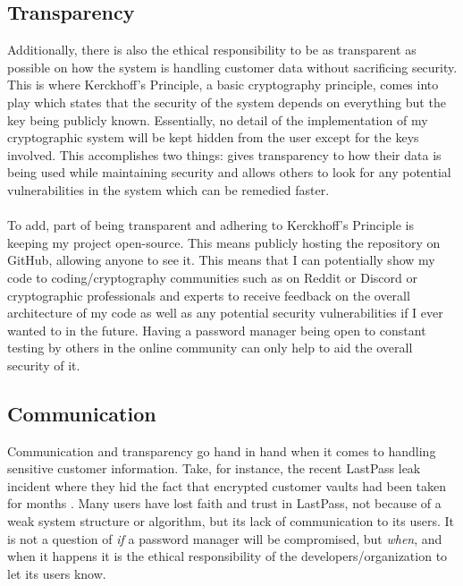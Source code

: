 \documentclass[10pt,twocolumn]{article}
\begin{document}
\subsection{Transparency}
Additionally, there is also the ethical responsibility to be as transparent as possible on how the system is handling customer data without sacrificing security. This is where Kerckhoff's Principle, a basic cryptography principle, comes into play which states that the security of the system depends on everything but the key being publicly known. Essentially, no detail of the implementation of my cryptographic system will be kept hidden from the user except for the keys involved. This accomplishes two things: gives transparency to how their data is being used while maintaining security and allows others to look for any potential vulnerabilities in the system which can be remedied faster\cite{mrdovic2008kerckhoffs}.
\paragraph{}
To add, part of being transparent and adhering to Kerckhoff's Principle is keeping my project open-source. This means publicly hosting the repository on GitHub, allowing anyone to see it. This means that I can potentially show my code to coding/cryptography communities such as on Reddit or Discord or cryptographic professionals and experts to receive feedback on the overall architecture of my code as well as any potential security vulnerabilities if I ever wanted to in the future. Having a password manager being open to constant testing by others in the online community can only help to aid the overall security of it.
\subsection{Communication}
Communication and transparency go hand in hand when it comes to handling sensitive customer information. Take, for instance, the recent LastPass leak incident where they hid the fact that encrypted customer vaults had been taken for months \cite{clark_2022}. Many users have lost faith and trust in LastPass, not because of a weak system structure or algorithm, but its lack of communication to its users. It is not a question of \emph{if} a password manager will be compromised, but \emph{when}, and when it happens it is the ethical responsibility of the developers/organization to let its users know.
\end{document}
